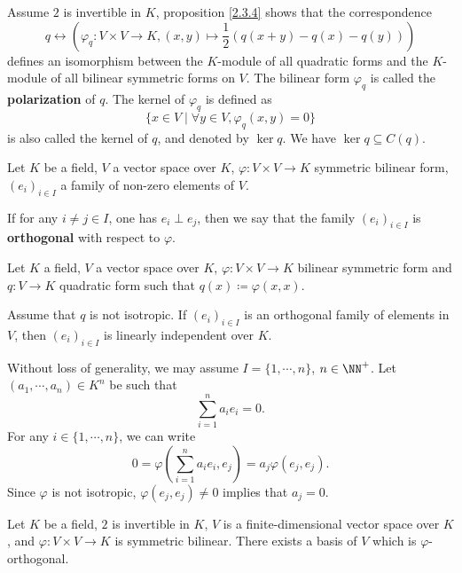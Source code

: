 \begin{remark}
    Assume $2$ is invertible in $K$, proposition \ref{2.3.4} shows that the correspondence
    $$ q\leftrightarrow \left(\varphi_q : V\times V\rightarrow K, (x,y) \mapsto \frac{1}{2} \left(q(x+y) - q(x) -q(y)\right)\right)$$
    defines an isomorphism between the $K$-module of all quadratic forms and the $K$-module of all bilinear symmetric forms on $V$. The bilinear form $\varphi_q$ is called the \textbf{polarization} of $q$. The kernel of $\varphi_q$ is defined as
    $$\{x\in V\mid  \forall y\in V, \varphi_q(x,y) = 0\}$$
    is also called the kernel of $q$, and denoted by $\ker q$. We have $\ker q\subseteq C(q)$.
\end{remark}
\begin{definitionenv}
    Let $K$ be a field, $V$ a vector space over $K$, $\varphi:V\times V\rightarrow K$ symmetric bilinear form, $\left(e_i\right)_{i\in I}$ a family of non-zero elements of $V$.
    
    \quad If for any $i\neq j\in I$, one has $e_i\perp e_j$, then we say that the family $\left(e_i\right)_{i\in I}$ is \textbf{orthogonal} with respect to $\varphi$.
\end{definitionenv}
\begin{propositionenv}
    Let $K$ a field, $V$ a vector space over $K$, $\varphi:V\times V\rightarrow K$ bilinear symmetric form and $q: V\rightarrow K$ quadratic form such that $q(x)\coloneq \varphi(x,x)$.

    \quad Assume that $q$ is not isotropic. If $\left(e_i\right)_{i\in I}$ is an orthogonal family of elements in $V$, then $\left(e_i\right)_{i\in I}$ is linearly independent over $K$.
\end{propositionenv}
\begin{proofenv}
    Without loss of generality, we may assume $I=\{1,\cdots,n\}$, $n\in \NN^+$. Let $\left(a_1,\cdots,a_n\right)\in K^n$ be such that 
    $$ \sum_{i=1}^{n} a_i e_i = 0.$$
    For any $i\in \{1,\cdots,n\}$, we can write 
    $$0 = \varphi\left(\sum_{i=1}^{n}a_i e_i ,e_j\right) = a_j \varphi(e_j,e_j).$$
    Since $\varphi$ is not isotropic, $\varphi(e_j,e_j)\neq 0 $ implies that $a_j=0$.
\end{proofenv}
\begin{propositionenv}
    Let $K$ be a field, $2$ is invertible in $K$, $V$ is a finite-dimensional vector space over $K$, and $\varphi : V\times V\rightarrow K$ is symmetric bilinear. There exists a basis of $V$ which is $\varphi$-orthogonal.
\end{propositionenv}
